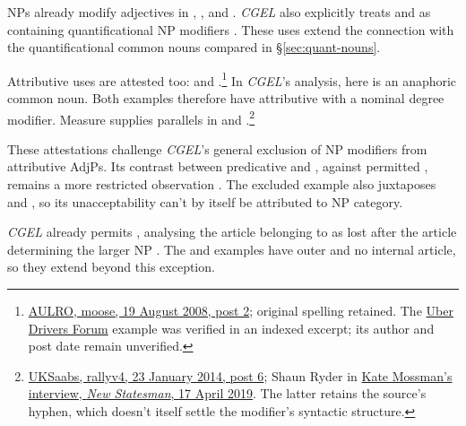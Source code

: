 \documentclass[12pt]{article}
\begin{document}
NPs already modify adjectives in , , and . \textit{CGEL} also explicitly treats  and  as containing quantificational NP modifiers \citep[549--550]{huddleston2002}. These uses extend the connection with the quantificational common nouns compared in §\ref{sec:quant-nouns}.

Attributive uses are attested too:  and .\footnote{\href{https://www.aulro.com/afvb/motor-cycling/61858-my-track-day-phillip-island-motogp-track-post798794.html}{AULRO, moose, 19 August 2008, post 2}; original spelling retained. The \href{https://www.uberpeople.net/threads/let-s-play-would-you-have-taken-this-trip.395130/}{Uber Drivers Forum} example was verified in an indexed excerpt; its author and post date remain unverified.} In \textit{CGEL}'s analysis,  here is an anaphoric common noun. Both examples therefore have attributive  with a nominal degree modifier. Measure  supplies parallels in  and .\footnote{\href{https://www.uksaabs.co.uk/UKS/viewtopic.php?t=131481\#p1256815}{UKSaabs, rallyv4, 23 January 2014, post 6}; Shaun Ryder in \href{https://www.newstatesman.com/culture/2019/04/i-look-like-uncle-fester-the-second-life-of-shaun-ryder}{Kate Mossman's interview, \textit{New Statesman}, 17 April 2019}. The latter retains the source's hyphen, which doesn't itself settle the modifier's syntactic structure.}

These attestations challenge \textit{CGEL}'s general exclusion of NP modifiers from attributive AdjPs. Its contrast between predicative  and , against permitted , remains a more restricted observation \citep[551--552]{huddleston2002}. The excluded example also juxtaposes  and , so its unacceptability can't by itself be attributed to NP category.

\textit{CGEL} already permits , analysing the article belonging to  as lost after the article determining the larger NP \citep[p.~552, n.~8]{huddleston2002}. The  and  examples have outer  and no internal article, so they extend beyond this exception.
\end{document}
